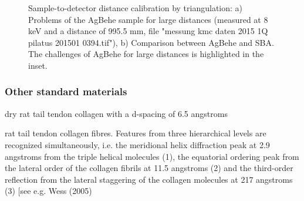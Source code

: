 \begin{figure}
	\centering
		\caption{Sample-to-detector distance calibration by triangulation: a) Problems of the AgBehe sample for large distances (measured at 8 keV and a distance of 995.5 mm, file "messung kmc daten 2015 1Q pilatus 201501 0394.tif"), b) Comparison between AgBehe and SBA. The challenges of AgBehe for large distances is highlighted in the inset.}
\end{figure}

\subsubsection{Other standard materials}

dry rat tail tendon collagen with a d-spacing of 6.5 angstroms \cite{amenitsch_performance_1997}

rat tail tendon collagen fibres. Features from three hierarchical levels are recognized simultaneously, i.e. the meridional helix diffraction peak at 2.9 angstroms from the triple helical molecules (1), the equatorial ordering peak from the lateral order of the collagen fibrils at 11.5 angstroms (2) and the third-order reflection from the lateral staggering of the collagen molecules at 217 angstroms (3) [see e.g. Wess (2005)

